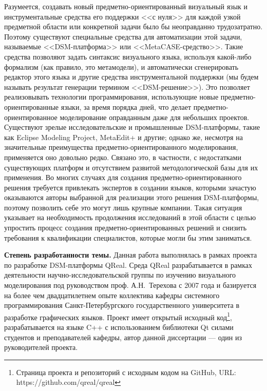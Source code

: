 Разумеется, создавать новый предметно-ориентированный визуальный язык и 
инструментальные средства его поддержки <<с нуля>> для каждой узкой предметной 
области или конкретной задачи было бы неоправданно трудозатратно. Поэтому 
существуют специальные средства для автоматизации этой задачи, называемые 
<<DSM-платформа>> или <<MetaCASE-средство>>. Такие средства позволяют задать 
синтаксис визуального языка, используя какой-либо формализм (как правило, 
это метамодели), и автоматически сгенерировать редактор этого языка и другие средства инструментальной 
поддержки (мы будем называть результат генерации термином <<DSM-решение>>). 
Это позволяет реализовывать технологии программирования, использующие новые предметно-ориентированные языки, за время 
порядка дней, что делает предметно-ориентированное моделирование оправданным 
даже для небольших проектов. Существуют зрелые исследовательские и промышленные 
DSM-платформы, такие как Eclipse Modeling Project, MetaEdit+ и другие; однако же, 
несмотря на значительные преимущества предметно-ориентированного 
моделирования, применяется оно довольно редко. Связано это, в частности, с 
недостатками существующих платформ и отсутствием развитой методологической 
базы для их применения. Во многих случаях для создания предметно-ориентированного 
решения требуется привлекать экспертов в создании языков, которыми зачастую 
оказываются авторы выбранной для реализации этого решения DSM-платформы, поэтому 
позволить себе это могут лишь крупные компании. Такая ситуация указывает на 
необходимость продолжения исследований в этой области с целью упростить процесс создания
предметно-ориентированных решений и снизить требования к квалификации специалистов, 
которые могли бы этим заниматься.

\textbf{Степень разработанности темы.}
Данная работа выполнялась в рамках проекта по разработке DSM-платформы QReal. Среда 
QReal разрабатывается в рамках деятельности научно-исследовательской группы по изучению 
визуального моделирования под руководством проф. А.Н.~Терехова с 2007 года и базируется 
на более чем двадцатилетнем опыте коллектива кафедры системного программирования Санкт-Петербургского 
государственного университета в разработке графических языков. Проект имеет открытый 
исходный код\footnote{Страница проекта и репозиторий с исходным кодом на GitHub, URL: https://github.com/qreal/qreal}, 
разрабатывается на языке C++ с использованием библиотеки Qt силами студентов и преподавателей 
кафедры, автор данной диссертации --- один из руководителей проекта.

